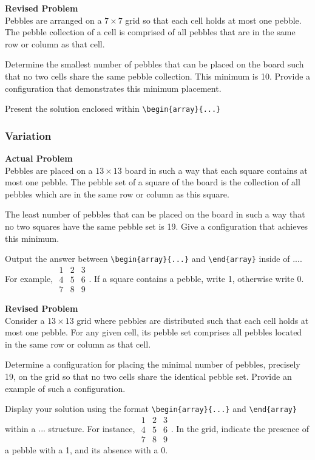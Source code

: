 \textbf{Revised Problem}\\
Pebbles are arranged on a \(7 \times 7\) grid so that each cell holds at most one pebble. The pebble collection of a cell is comprised of all pebbles that are in the same row or column as that cell.

Determine the smallest number of pebbles that can be placed on the board such that no two cells share the same pebble collection. This minimum is 10. Provide a configuration that demonstrates this minimum placement.

Present the solution enclosed within \verb|\begin{array}{...}|

\subsubsection{Variation}
\textbf{Actual Problem}\\
Pebbles are placed on a $13 \times 13$ board in such a way that each square contains at most one pebble. The pebble set of a square of the board is the collection of all pebbles which are in the same row or column as this square.

The least number of pebbles that can be placed on the board in such a way that no two squares have the same pebble set is 19. Give a configuration that achieves this minimum.

Output the answer between \verb|\begin{array}{...}| and \verb|\end{array}| inside of $\boxed{...}$. For example, $\boxed{\begin{array}{ccc}1 & 2 & 3 \\ 4 & 5 & 6 \\ 7 & 8 & 9\end{array}}$.
If a square contains a pebble, write 1, otherwise write 0.

\textbf{Revised Problem}\\
Consider a $13 \times 13$ grid where pebbles are distributed such that each cell holds at most one pebble. For any given cell, its pebble set comprises all pebbles located in the same row or column as that cell.

Determine a configuration for placing the minimal number of pebbles, precisely 19, on the grid so that no two cells share the identical pebble set. Provide an example of such a configuration.

Display your solution using the format \verb|\begin{array}{...}| and \verb|\end{array}| within a $\boxed{...}$ structure. For instance, $\boxed{\begin{array}{ccc}1 & 2 & 3 \\ 4 & 5 & 6 \\ 7 & 8 & 9\end{array}}$. In the grid, indicate the presence of a pebble with a 1, and its absence with a 0.

